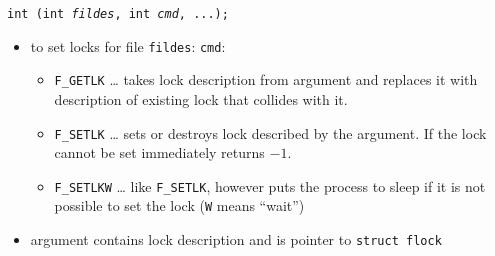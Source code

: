 

\begin{slide}
\texttt{int (int \emph{fildes}, int \emph{cmd}, ...);}
\begin{itemize}
\item to set locks for file \texttt{fildes}:
\texttt{cmd}:
    \begin{itemize}
    \item \texttt{F\_GETLK} \dots{} takes lock description from  argument
    and replaces it with description of existing lock that collides with it.
    \item \texttt{F\_SETLK} \dots{} sets or destroys lock described by the 
    argument. If the lock cannot be set immediately returns $-1$.
    \item \texttt{F\_SETLKW} \dots{} like \texttt{F\_SETLK}, however puts
    the process to sleep if it is not possible to set the lock
    (\texttt{W} means ``wait'')
    \end{itemize}
\item {} argument contains lock description and is pointer to
\texttt{struct flock}
\end{itemize}
\end{slide}

